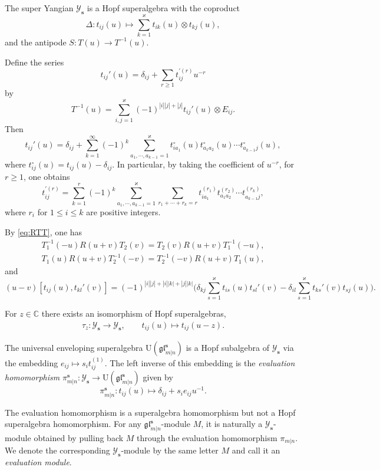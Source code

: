\documentclass[11pt,reqno]{amsart}
\numberwithin{equation}{section}
\theoremstyle{definition}
\theoremstyle{remark}
\newcommand{\beq}{\begin{equation}}
\newcommand{\eeq}{\end{equation}}
\newcommand{\C}{\mathbb{C}}
\newcommand{\gge}{\geqslant}
\newcommand{\lle}{\leqslant}
\newcommand{\glMN}{\mathfrak{gl}_{m|n}^{\bm s}}
\newcommand{\UglMN}{\mathrm{U}(\mathfrak{gl}_{m|n}^\s)}
\newcommand{\YglMN}{\mathscr{Y}_{\bm s}}
\newcommand{\ka}{\varkappa}
\newcommand{\s}{{\bm s}}
\begin{document}
The super Yangian $\YglMN$ is a Hopf superalgebra with the coproduct
\beq\label{eq Hopf}
\Delta: t_{ij}(u)\mapsto \sum_{k=1}^\ka t_{ik}(u)\otimes t_{kj}(u),
\eeq
and the antipode $S:T(u)\to T^{-1}(u)$.

Define the series
$$
t_{ij}'(u)=\delta_{ij}+\sum_{r\gge 1} {t}_{ij}^{\prime( r)}u^{-r}
$$
by
\beq\label{eq:inverseT}
T^{-1}(u)=\sum_{i,j=1}^\ka (-1)^{|i||j|+|j|}  t_{ij}'(u)\otimes E_{ij}.
\eeq
Then
\beq\label{eq:T'-expression}
t_{ij}'(u)=\delta_{ij}+\sum_{k=1}^\infty (-1)^k\sum_{a_1,\cdots,a_{k-1}=1}^\ka t_{ia_1}^\circ(u)t_{a_1a_2}^\circ(u)\cdots t_{a_{k-1}j}^\circ(u),
\eeq
where $t_{ij}^\circ(u)=t_{ij}(u)-\delta_{ij}$. In particular, by taking the coefficient of $u^{-r}$, for $r\gge 1$, one obtains
\beq\label{eq:T-expression-comp}
t_{ij}^{\prime(r)}=\sum_{k=1}^r (-1)^k\sum_{a_1,\cdots,a_{k-1}=1}^\ka\sum_{r_1+\cdots+r_k=r}t_{ia_1}^{(r_1)}t_{a_1a_2}^{(r_2)}\cdots t_{a_{k-1}j}^{(r_k)},
\eeq
where $r_i$ for $1\lle i\lle k$ are positive integers.

By \eqref{eq:RTT}, one has
\beq\label{eq:T'RT}
\begin{split}
T_1^{-1}(-u)R(u+v)T_2(v)=T_2(v)R(u+v)T_1^{-1}(-u),\\
T_1(u)R(u+v)T_2^{-1}(-v)=T_2^{-1}(-v)R(u+v)T_1(u),
\end{split}
\eeq
and
\beq\label{eq:tt'}
(u-v)[t_{ij}(u),t_{kl}'(v)]=(-1)^{|i||j|+|i||k|+|j||k|}\Big(\delta_{kj}\sum_{s=1}^\ka t_{is}(u)t_{sl}'(v)-\delta_{il}\sum_{s=1}^{\ka}t_{ks}'(v)t_{sj}(u)\Big).
\eeq

For $z\in\C$ there exists an isomorphism of Hopf superalgebras,
\begin{align}
\tau_z:\YglMN\to\YglMN, \qquad t_{ij}(u)\mapsto t_{ij}(u-z).\label{eq tau z}
\end{align}

The universal enveloping superalgebra $\mathrm U(\glMN)$ is a Hopf subalgebra of $\YglMN$ via the embedding $e_{ij}\mapsto s_it_{ij}^{(1)}$. The left inverse of this embedding is the \emph{evaluation homomorphism} $\pi_{m|n}^\s: \YglMN\to \UglMN$ given by
\beq\label{eq:evaluation-map}
\pi_{m|n}^\s: t_{ij}(u)\mapsto \delta_{ij}+s_ie_{ij}u^{-1}.
\eeq

The evaluation homomorphism is a superalgebra homomorphism but not a Hopf superalgebra homomorphism.
For any $\glMN$-module $M$, it is naturally a $\YglMN$-module obtained by pulling back $M$ through the evaluation homomorphism $\pi_{m|n}$. We denote the corresponding $\YglMN$-module by the same letter $M$ and call it an \emph{evaluation module}.
\end{document}
